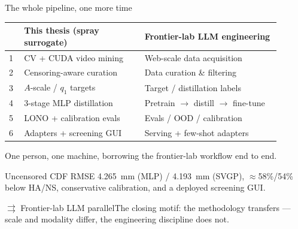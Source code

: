 \documentclass[aspectratio=169,11pt]{beamer}
\newcommand{\good}[1]{\textcolor{goodGreen}{#1}}
\newcommand{\blue}[1]{\textcolor{aaltoBlue}{#1}}
\newcommand{\llmparallel}[1]{%
  \begin{block}{$\rightrightarrows$ Frontier-lab LLM parallel}#1\end{block}}
\begin{document}
\begin{frame}{The whole pipeline, one more time}
\small
\begin{center}
\renewcommand{\arraystretch}{1.02}
\begin{tabular}{L{0.05\linewidth} L{0.40\linewidth} L{0.45\linewidth}}
\toprule
 & \textbf{This thesis (spray surrogate)} & \textbf{\blue{Frontier-lab LLM engineering}} \\
 & CV + CUDA video mining & Web-scale data acquisition \\
2 & Censoring-aware curation & Data curation \& filtering \\
3 & $A$-scale / $q_1$ targets & Target / distillation labels \\
4 & 3-stage MLP distillation & Pretrain $\to$ distill $\to$ fine-tune \\
5 & LONO + calibration evals & Evals / OOD / calibration \\
6 & Adapters + screening GUI & Serving + few-shot adapters \\
\bottomrule
\end{tabular}
\end{center}
\medskip
\begin{center}\blue{One person, one machine, borrowing the frontier-lab workflow end to end.}\end{center}
\medskip
Uncensored CDF RMSE \good{4.265}~mm (MLP) / \good{4.193}~mm (SVGP), \good{$\approx$58\%/54\%}
below HA/NS, conservative calibration, and a deployed screening GUI.
\llmparallel{The closing motif: the \blue{methodology transfers} --- scale and modality
differ, the engineering discipline does not.}
\end{frame}
\end{document}
